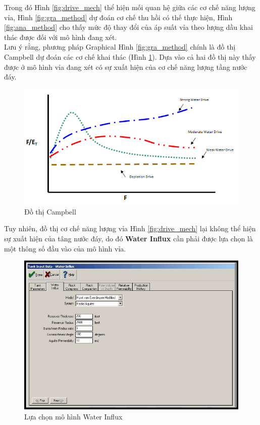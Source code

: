 \documentclass[12pt,a4paper]{report}
\begin{document}
        \clearpage
        \noindent
Trong đó Hình \ref{fig:drive_mech} thể hiện mối quan hệ giữa các cơ chế năng lượng vỉa, Hình \ref{fig:gra_method} dự đoán cơ chế thu hồi có thế thực hiện, Hình \ref{fig:ana_method} cho thấy mức độ thay đổi của áp suất vỉa theo lượng dầu khai thác được đối với mô hình đang xét.\\
Lưu ý rằng, phương pháp Graphical Hình \ref{fig:gra_method} chính là đồ thị Campbell dự đoán các cơ chế khai thác (Hình \ref{fig:campbell_plot}). Dựa vào cả hai đồ thị này thấy được ở mô hình vỉa đang xét có sự xuất hiện của cơ chế năng lượng tầng nước đáy. 
		\begin{figure}[h]
        	\centering
            \includegraphics[scale=1]{Fig/Campbell.png}
            \caption{Đồ thị Campbell}
            \label{fig:campbell_plot}
        \end{figure}
        \newline
Tuy nhiên, đồ thị cơ chế năng lượng vỉa Hình \ref{fig:drive_mech} lại không thể hiện sự xuất hiện của tâng nước đáy, do đó \textbf{Water Influx} cần phải được lựa chọn là một thông số đầu vào của mô hình vỉa.
		\begin{figure}[h]
        	\centering
            \includegraphics[scale=1]{Fig/water_influx_1.png}
            \caption{Lựa chọn mô hình Water Influx}
            \label{fig:aquifer_model}
        \end{figure}
\end{document}
